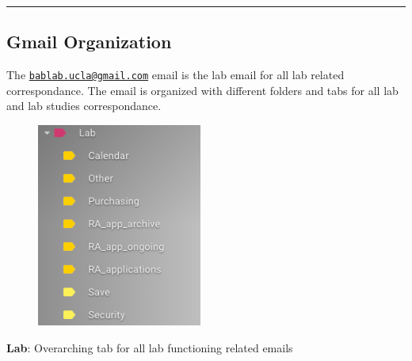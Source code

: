 \documentclass[]{book}
\begin{document}
\begin{center}\rule{0.5\linewidth}{0.5pt}\end{center}

\hypertarget{gmail-organization}{%
\subsection{Gmail Organization}\label{gmail-organization}}

The \href{mailto:bablab.ucla@gmail.com}{\nolinkurl{bablab.ucla@gmail.com}} email is the lab email for all lab related correspondance. The email is organized with different folders and tabs for all lab and lab studies correspondance.

\begin{figure}
\centering
\includegraphics{images/lab_protocols/gmail/gmail_1.png}
\caption{}
\end{figure}

\textbf{Lab}: Overarching tab for all lab functioning related emails
\end{document}
